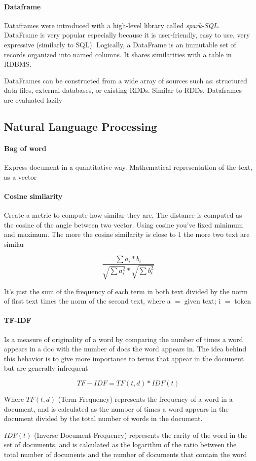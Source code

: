 \paragraph{Dataframe} 
Dataframes were introduced with a high-level library called \textit{spark-SQL}. DataFrame is very popular especially because it is user-friendly, easy to use, very expressive (similarly to SQL). Logically, a DataFrame is an immutable set of records organized into named columns. It shares similarities with a table in RDBMS.

DataFrames can be constructed from a wide array of sources such as: structured data files, external databases, or existing RDDs. Similar to RDDs, Dataframes are evaluated lazily


\subsection{Natural Language Processing}

\paragraph{Bag of word}
Express document in a quantitative way. Mathematical representation of the text, as a vector

\paragraph{Cosine similarity}
Create a metric to compute how similar they are. The distance is computed as the cosine of the angle between two vector. Using cosine you’ve fixed minimum and maximum. The more the cosine similarity is close to $1$ the more two text are similar
    
$$\frac{\sum a_i * b_i}{\sqrt{\sum a^2_i} * \sqrt{\sum b^2_i}}$$

It's just the sum of the frequency of each term in both text divided by the norm of first text times the norm of the second text, where a $=$ given text; i $=$ token

\paragraph{TF-IDF}
Is a measure of originality of a word by comparing the number of times a word appears in a doc with the number of docs the word appears in. The idea behind this behavior is to give more importance to terms that appear in the document but are generally infrequent

$$TF-IDF = TF(t,d) * IDF(t)$$

Where $TF(t,d)$ (Term Frequency) represents the frequency of a word in a document, and is calculated as the number of times a word appears in the document divided by the total number of words in the document.

$IDF(t)$ (Inverse Document Frequency) represents the rarity of the word in the set of documents, and is calculated as the logarithm of the ratio between the total number of documents and the number of documents that contain the word

\newpage